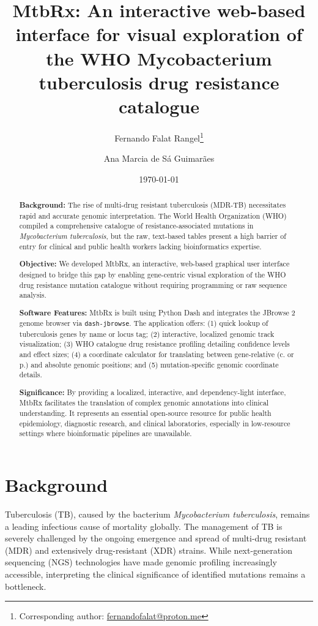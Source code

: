 \documentclass{article}
\title{MtbRx: An interactive web-based interface for visual exploration of the WHO Mycobacterium tuberculosis drug resistance catalogue}
\author{Fernando Falat Rangel\thanks{Corresponding author: \href{mailto:fernandofalat@proton.me}{fernandofalat@proton.me}} \and Ana Marcia de S\'a Guimar\~aes}
\date{\today}
\begin{document}
\maketitle

\begin{abstract}
\noindent\textbf{Background:} The rise of multi-drug resistant tuberculosis (MDR-TB) necessitates rapid and accurate genomic interpretation. The World Health Organization (WHO) compiled a comprehensive catalogue of resistance-associated mutations in \textit{Mycobacterium tuberculosis}, but the raw, text-based tables present a high barrier of entry for clinical and public health workers lacking bioinformatics expertise.

\medskip
\noindent\textbf{Objective:} We developed MtbRx, an interactive, web-based graphical user interface designed to bridge this gap by enabling gene-centric visual exploration of the WHO drug resistance mutation catalogue without requiring programming or raw sequence analysis.

\medskip
\noindent\textbf{Software Features:} MtbRx is built using Python Dash and integrates the JBrowse 2 genome browser via \texttt{dash-jbrowse}. The application offers: (1) quick lookup of tuberculosis genes by name or locus tag; (2) interactive, localized genomic track visualization; (3) WHO catalogue drug resistance profiling detailing confidence levels and effect sizes; (4) a coordinate calculator for translating between gene-relative (c. or p.) and absolute genomic positions; and (5) mutation-specific genomic coordinate details.

\medskip
\noindent\textbf{Significance:} By providing a localized, interactive, and dependency-light interface, MtbRx facilitates the translation of complex genomic annotations into clinical understanding. It represents an essential open-source resource for public health epidemiology, diagnostic research, and clinical laboratories, especially in low-resource settings where bioinformatic pipelines are unavailable.
\end{abstract}

\clearpage

\section{Background}
Tuberculosis (TB), caused by the bacterium \textit{Mycobacterium tuberculosis}, remains a leading infectious cause of mortality globally. The management of TB is severely challenged by the ongoing emergence and spread of multi-drug resistant (MDR) and extensively drug-resistant (XDR) strains. While next-generation sequencing (NGS) technologies have made genomic profiling increasingly accessible, interpreting the clinical significance of identified mutations remains a bottleneck.
\end{document}
